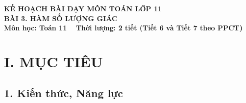 \documentclass[12pt, a4paper]{article}
\begin{document}
\begin{center}
    {\fontsize{14pt}{17pt}\selectfont \textbf{KẾ HOẠCH BÀI DẠY MÔN TOÁN LỚP 11}}\\[6pt]
    {\fontsize{16pt}{19pt}\selectfont \textbf{BÀI 3. HÀM SỐ LƯỢNG GIÁC}}\\[4pt]
    {\fontsize{12pt}{15pt}\selectfont \textbf{Môn học: Toán 11} \ \textbar \ \textbf{Thời lượng: 2 tiết (Tiết 6 và Tiết 7 theo PPCT)}}
\end{center}

\vspace{5pt}

\section*{I. MỤC TIÊU}

\subsection*{1. Kiến thức, Năng lực}
\end{document}
